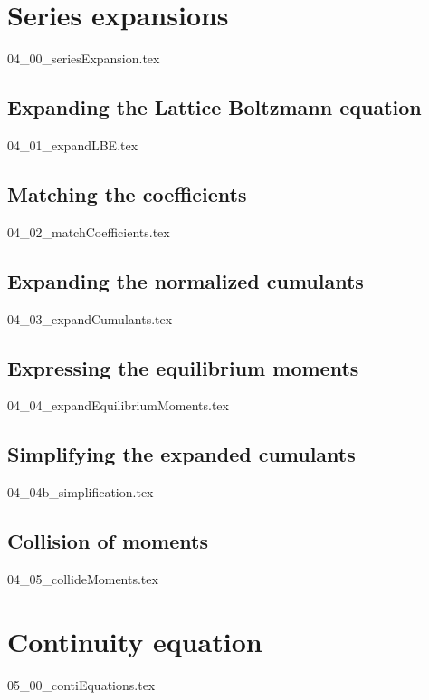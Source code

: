 \documentclass[12pt,a4paper,twoside]{article}
\begin{document}
\section{Series expansions}
\label{sec: Series expansions}
{04_00_seriesExpansion.tex}


\subsection{Expanding the Lattice Boltzmann equation}
\label{sub: Expanding the Lattice Boltzmann equation}
{04_01_expandLBE.tex}

\subsection{Matching the coefficients}
\label{sub: Matching the coefficients}
{04_02_matchCoefficients.tex}

\subsection{Expanding the normalized cumulants}
\label{sub: Expanding the normalized cumulants}
{04_03_expandCumulants.tex}

\subsection{Expressing the equilibrium moments}
\label{sub: Expressing the equilibrium moments}
{04_04_expandEquilibriumMoments.tex}

\subsection{Simplifying the expanded cumulants}
\label{sub: Simplifying the expanded cumulants}
{04_04b_simplification.tex}

\subsection{Collision of moments}
\label{sub: Collision of moments}
{04_05_collideMoments.tex}

\section{Continuity equation}
\label{sec: Continuity equation}
{05_00_contiEquations.tex}
\end{document}
